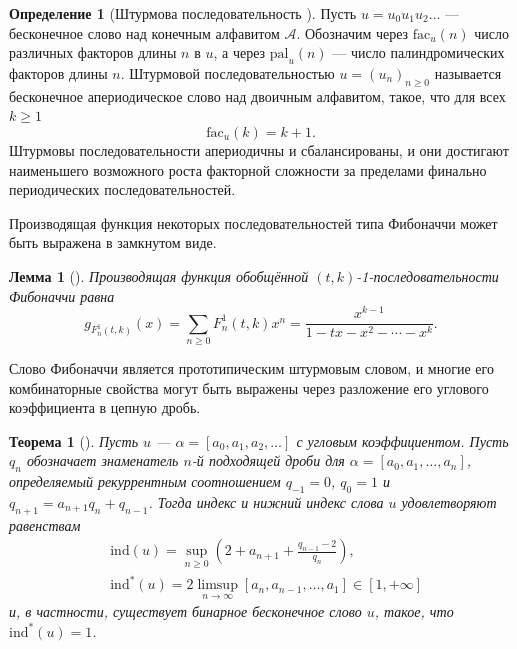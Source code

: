 \documentclass[a4paper,14pt]{extreport}
\theoremstyle{plain}
\newtheorem{theorem}{Теорема}[section]
\newtheorem{lemma}{Лемма}[section]
\theoremstyle{definition}
\newtheorem{definition}{Определение}[section]
\theoremstyle{remark}
\begin{document}
\begin{definition}[Штурмова последовательность {\cite{AlloucheBaake}}]\label{plann1}
	Пусть $u = u_0u_1u_2\ldots$ --- бесконечное слово над конечным алфавитом $\mathcal{A}$. Обозначим через $\mathrm{fac}_u(n)$ число различных факторов длины $n$ в $u$, а через $\mathrm{pal}_u(n)$ --- число палиндромических факторов длины $n$. Штурмовой последовательностью $u = (u_n)_{n \geq 0}$ называется бесконечное апериодическое слово над двоичным алфавитом, такое, что для всех $k \geq 1$
	\begin{equation}
		\mathrm{fac}_u(k) = k + 1.
	\end{equation}
	Штурмовы последовательности апериодичны и сбалансированы, и они достигают наименьшего возможного роста факторной сложности за пределами финально периодических последовательностей.
\end{definition}

Производящая функция некоторых последовательностей типа Фибоначчи может быть выражена в замкнутом виде.

\begin{lemma}[\cite{Mehraban2006Gulliver}]\label{lemgenn1}
	Производящая функция обобщённой $(t,k)$-1-последовательности Фибоначчи равна
	\begin{equation}
		g_{F_{n}^{1}(t,k)}(x)
		= \sum_{n \geq 0} F_{n}^{1}(t,k) x^{n}
		= \frac{x^{k-1}}{1 - t x - x^{2} - \cdots - x^{k}}.
	\end{equation}
\end{lemma}

Слово Фибоначчи является прототипическим штурмовым словом, и многие его комбинаторные свойства могут быть выражены через разложение его углового коэффициента в цепную дробь.

\begin{theorem}[{\cite{AlloucheBaake}}]\label{thmconsn1}
	Пусть $u$ --- $\alpha = [a_0,a_1,a_2,\ldots]$ с угловым коэффициентом. Пусть $q_n$ обозначает знаменатель $n$-й подходящей дроби для $\alpha = [a_0,a_1,\ldots,a_n]$, определяемый рекуррентным соотношением $q_{-1} = 0$, $q_0 = 1$ и $q_{n+1} = a_{n+1}q_n + q_{n-1}$. Тогда индекс и нижний индекс слова $u$ удовлетворяют равенствам
	\begin{align}
		&  \mathrm{ind}(u)
		= \sup_{n \geq 0} \left( 2 + a_{n+1} + \frac{q_{n-1} - 2}{q_n} \right),
		\\
		&\mathrm{ind}^*(u)
		= 2 \limsup_{n \to \infty} [a_n,a_{n-1},\ldots,a_1] \in [1,+\infty]
	\end{align}
	и, в частности, существует бинарное бесконечное слово $u$, такое, что $\mathrm{ind}^*(u) = 1$.
\end{theorem}
\end{document}
